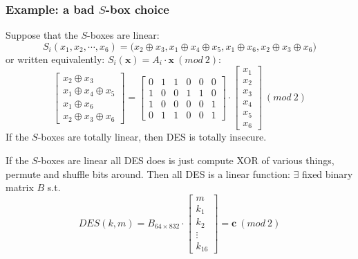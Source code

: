 \documentclass[12pt]{book}
\begin{document}
\subsubsection{Example: a bad $S$-box choice}
Suppose that the $S$-boxes are linear:
$$S_{i}(x_{1},x_{2},\cdots,x_{6})=\Big(x_{2}\oplus x_{3},x_{1}\oplus x_{4}\oplus x_{5},x_{1}\oplus x_{6},x_{2}\oplus x_{3}\oplus x_{6}\Big)$$or written equivalently: $S_{i}(\mathbf{x})=A_{i}\cdot\mathbf{x}\ (mod\ 2)$:
$$\left[\begin{array}{c}
	x_{2}\oplus x_{3}\\
	x_{1}\oplus x_{4}\oplus x_{5}\\
	x_{1}\oplus x_{6}\\
	x_{2}\oplus x_{3}\oplus x_{6}
\end{array}\right]=\left[\begin{array}{cccccc}
	0&1&1&0&0&0\\
	1&0&0&1&1&0\\
	1&0&0&0&0&1\\
	0&1&1&0&0&1
\end{array}\right]\cdot\left[\begin{array}{c}
	x_{1}\\
	x_{2}\\
	x_{3}\\
	x_{4}\\
	x_{5}\\
	x_{6}
\end{array}\right]\ (mod\ 2)$$If the $S$-boxes are totally linear, then DES is totally insecure.

If the $S$-boxes are linear all DES does is just compute XOR of various things, permute and shuffle bits around. Then all DES is a linear function: $\exists$ fixed binary matrix $B$ s.t.
$$DES(k,m)=B_{64\times 832}\cdot\left[\begin{array}{c}
	m\\
	k_{1}\\
	k_{2}\\
	\vdots\\
	k_{16}
\end{array}\right]=\mathbf{c}\ (mod\ 2)$$
\end{document}
